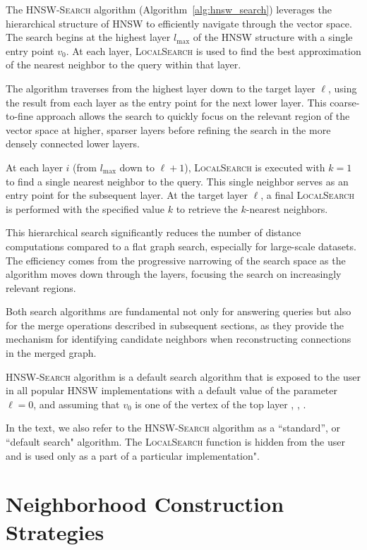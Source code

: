 \documentclass{article}
\begin{document}
The \textsc{HNSW-Search} algorithm (Algorithm~\ref{alg:hnsw_search}) leverages the hierarchical structure of HNSW to efficiently navigate through the vector space. The search begins at the highest layer $l_{\max}$ of the HNSW structure with a single entry point $v_0$. At each layer, \textsc{LocalSearch} is used to find the best approximation of the nearest neighbor to the query within that layer.

The algorithm traverses from the highest layer down to the target layer $\ell$, using the result from each layer as the entry point for the next lower layer. This coarse-to-fine approach allows the search to quickly focus on the relevant region of the vector space at higher, sparser layers before refining the search in the more densely connected lower layers.

At each layer $i$ (from $l_{\max}$ down to $\ell+1$), \textsc{LocalSearch} is executed with $k=1$ to find a single nearest neighbor to the query. This single neighbor serves as an entry point for the subsequent layer. At the target layer $\ell$, a final \textsc{LocalSearch} is performed with the specified value $k$ to retrieve the $k$-nearest neighbors.

This hierarchical search significantly reduces the number of distance computations compared to a flat graph search, especially for large-scale datasets. The efficiency comes from the progressive narrowing of the search space as the algorithm moves down through the layers, focusing the search on increasingly relevant regions.

Both search algorithms are fundamental not only for answering queries but also for the merge operations described in subsequent sections, as they provide the mechanism for identifying candidate neighbors when reconstructing connections in the merged graph.

\textsc{HNSW-Search} algorithm is a default search algorithm that is exposed to the user in all popular HNSW implementations with a default value of the parameter $\ell = 0$, and assuming that $v_0$ is one of the vertex of the top layer \cite{Vardanian_USearch_2023}, \cite{hnswlib2025}, \cite{faiss}.

In the text, we also refer to the \textsc{HNSW-Search} algorithm as a ``standard'', or ``default search" algorithm. The \textsc{LocalSearch} function is hidden from the user and is used only as a part of a particular implementation".


\section{Neighborhood Construction Strategies}
\label{sec:neighborhood}
\end{document}
